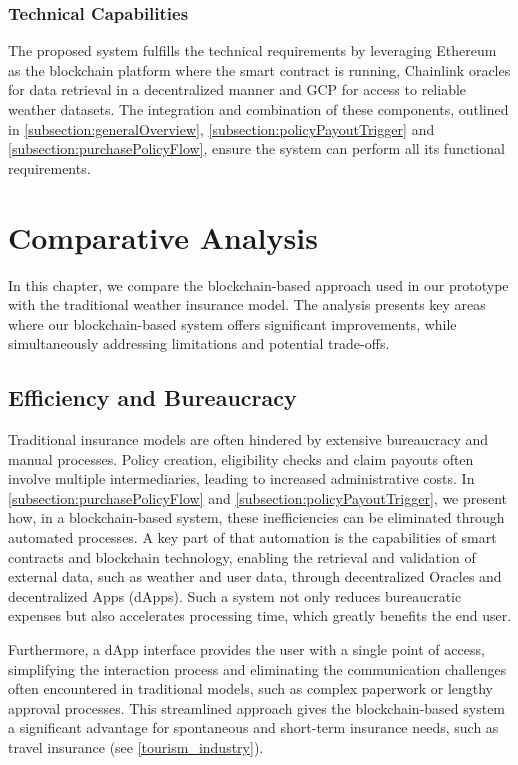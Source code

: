 \subsubsection{Technical Capabilities}
The proposed system fulfills the technical requirements by leveraging Ethereum as the blockchain platform where the smart contract is running, Chainlink oracles for data retrieval in a decentralized manner and GCP for access to reliable weather datasets. The integration and combination of these components, outlined in \cref{subsection:generalOverview}, \cref{subsection:policyPayoutTrigger} and \cref{subsection:purchasePolicyFlow}, ensure the system can perform all its functional requirements.

\section{Comparative Analysis}\label{comparitive_analysis}
In this chapter, we compare the blockchain-based approach used in our prototype with the traditional weather insurance model. The analysis presents key areas where our blockchain-based system offers significant improvements, while simultaneously addressing limitations and potential trade-offs.

\subsection{Efficiency and Bureaucracy}\label{efficiency_bureaucracy}
Traditional insurance models are often hindered by extensive bureaucracy and manual processes. Policy creation, eligibility checks and claim payouts often involve multiple intermediaries, leading to increased administrative costs. In \cref{subsection:purchasePolicyFlow} and \cref{subsection:policyPayoutTrigger}, we present how, in a blockchain-based system, these inefficiencies can be eliminated through automated processes. A key part of that automation is the capabilities of smart contracts and blockchain technology, enabling the retrieval and validation of external data, such as weather and user data, through decentralized Oracles and decentralized Apps (dApps). Such a system not only reduces bureaucratic expenses but also accelerates processing time, which greatly benefits the end user.

Furthermore, a dApp interface provides the user with a single point of access, simplifying the interaction process and eliminating the communication challenges often encountered in traditional models, such as complex paperwork or lengthy approval processes. This streamlined approach gives the blockchain-based system a significant advantage for spontaneous and short-term insurance needs, such as travel insurance (see \cref{tourism_industry}).

